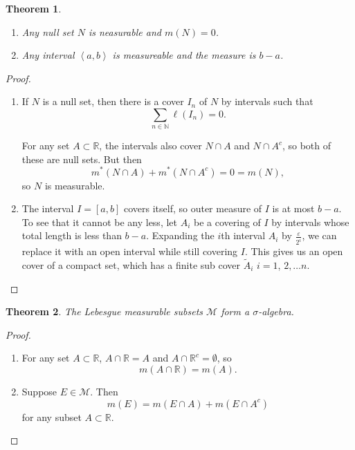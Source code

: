 \documentclass[a4paper]{scrartcl}
\newcommand{\R}{\mathbb{R}}
\newcommand{\N}{\mathbb{N}}
\theoremstyle{definition}
\theoremstyle{plain}
\newtheorem{theorem}{Theorem}[section]
\theoremstyle{remark}
\begin{document}
\begin{theorem}
  \label{thm:nullsetsandintervalsarelebesguemeasurable}
  $\,$
  \begin{enumerate}
    \item Any null set $N$ is neasurable and $m(N) = 0$.

    \item Any interval $\left\langle a, b \right\rangle$ is measureable and the measure is $b-a$.
  \end{enumerate}
\end{theorem}
\begin{proof}
  $\,$
  \begin{enumerate}
    \item If $N$ is a null set, then there is a cover $I_{n}$ of $N$ by intervals such that
      \begin{equation*}
        \sum_{n \in \N} \ell(I_{n}) = 0.
      \end{equation*}

      For any set $A \subset \R$, the intervals also cover $N \cap A$ and $N \cap A^{c}$, so both of these are null sets. But then
      \begin{equation*}
        m^{*}(N \cap A) + m^{*}(N \cap A^{c}) = 0 = m(N),
      \end{equation*}
      so $N$ is measurable.

    \item The interval $I = [a, b]$ covers itself, so outer measure of $I$ is at most $b - a$. To see that it cannot be any less, let $A_{i}$ be a covering of $I$ by intervals whose total length is less than $b-a$. Expanding the $i$th interval $A_{i}$ by $\frac{\varepsilon}{2^{i}}$, we can replace it with an open interval while still covering $I$. This gives us an open cover of a compact set, which has a finite sub cover $\tilde{A}_{i}$ $i = 1$, $2, \ldots n$.
  \end{enumerate}
\end{proof}

\begin{theorem}
  The Lebesgue measurable subsets $\mathcal{M}$ form a $\sigma$-algebra.
\end{theorem}
\begin{proof}
  $\,$
  \begin{enumerate}
    \item For any set $A \subset \R$, $A \cap \R = A$ and $A \cap \R^{c} = \emptyset$, so
      \begin{equation*}
        m(A \cap \R) = m(A).
      \end{equation*}

    \item Suppose $E \in \mathcal{M}$. Then
      \begin{equation*}
        m(E) = m(E \cap A) + m(E \cap A^{c})
      \end{equation*}
      for any subset $A \subset \R$.
  \end{enumerate}
\end{proof}
\end{document}

